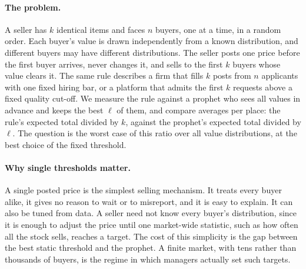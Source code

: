 \documentclass[11pt,a4paper]{article}
\theoremstyle{remark}
\begin{document}
\paragraph{The problem.}
A seller has $k$ identical items and faces $n$ buyers, one at a time, in a random order. Each buyer's value is drawn independently from a known distribution, and different buyers may have different distributions. The seller posts one price before the first buyer arrives, never changes it, and sells to the first $k$ buyers whose value clears it. The same rule describes a firm that fills $k$ posts from $n$ applicants with one fixed hiring bar, or a platform that admits the first $k$ requests above a fixed quality cut-off. We measure the rule against a prophet who sees all values in advance and keeps the best $\ell$ of them, and compare averages per place: the rule's expected total divided by $k$, against the prophet's expected total divided by $\ell$. The question is the worst case of this ratio over all value distributions, at the best choice of the fixed threshold.

\paragraph{Why single thresholds matter.}
A single posted price is the simplest selling mechanism. It treats every buyer alike, it gives no reason to wait or to misreport, and it is easy to explain. It can also be tuned from data. A seller need not know every buyer's distribution, since it is enough to adjust the price until one market-wide statistic, such as how often all the stock sells, reaches a target. The cost of this simplicity is the gap between the best static threshold and the prophet. A finite market, with tens rather than thousands of buyers, is the regime in which managers actually set such targets.
\end{document}
